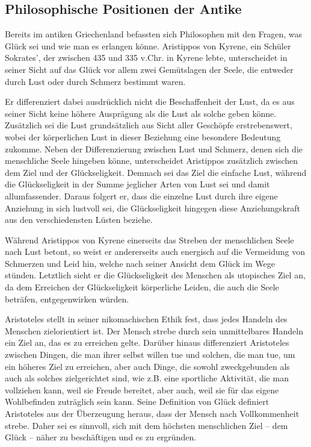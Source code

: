 \subsection{Philosophische Positionen der Antike}

Bereits im antiken Griechenland befassten sich Philosophen mit den Fragen, was Glück sei und wie man es erlangen könne. 
Aristippos von Kyrene, ein Schüler Sokrates', der zwischen 435 und 335 v.Chr. in Kyrene lebte, unterscheidet in seiner Sicht auf das Glück vor allem zwei Gemütslagen der Seele, die entweder durch Lust oder durch Schmerz bestimmt waren\cite[S.\,116]{DL67}.

Er differenziert dabei ausdrücklich nicht die Beschaffenheit der Lust, da es aus seiner Sicht keine höhere Ausprägung als die Lust als solche geben könne. 
Zusätzlich sei die Lust grundsätzlich aus Sicht aller Geschöpfe erstrebenswert, wobei der körperlichen Lust in dieser Beziehung eine besondere Bedeutung zukomme. 
Neben der Differenzierung zwischen Lust und Schmerz, denen sich die menschliche Seele hingeben könne, unterscheidet Aristippos zusätzlich zwischen dem Ziel und der Glückseligkeit. 
Demnach sei das Ziel die einfache Lust, während die Glückseligkeit in der Summe jeglicher Arten von Lust sei und damit allumfassender\cite[S.\,116]{DL67}.
Daraus folgert er, dass die einzelne Lust durch ihre eigene Anziehung in sich lustvoll sei, die Glückseligkeit hingegen diese Anziehungskraft aus den verschiedensten Lüsten beziehe. 

Während Aristippos von Kyrene einerseits das Streben der menschlichen Seele nach Lust betont, so weist er andererseits auch energisch auf die Vermeidung von Schmerzen und Leid hin, welche nach seiner Ansicht dem Glück im Wege stünden. 
Letztlich sieht er die Glückseligkeit des Menschen als utopisches Ziel an, da dem Erreichen der Glückseligkeit körperliche Leiden, die auch die Seele beträfen, entgegenwirken würden\cite[S.\,119]{DL67}.

Aristoteles stellt in seiner nikomachischen Ethik fest, dass jedes Handeln des Menschen zielorientiert ist. 
Der Mensch strebe durch sein unmittelbares Handeln ein Ziel an, das es zu erreichen gelte\cite[S.\,4]{MF93}.
Darüber hinaus differenziert Aristoteles zwischen Dingen, die man ihrer selbst willen tue und solchen, die man tue, um ein höheres Ziel zu erreichen, aber auch Dinge, die sowohl zweckgebunden als auch als solches zielgerichtet sind, wie z.B. eine sportliche Aktivität, die man vollziehen kann, weil sie Freude bereitet, aber auch, weil sie für das eigene Wohlbefinden zuträglich sein kann. 
Seine Definition von Glück definiert Aristoteles aus der Überzeugung heraus, dass der Mensch nach Vollkommenheit strebe. 
Daher sei es sinnvoll, sich mit dem höchsten menschlichen Ziel -- dem Glück -- näher zu beschäftigen und es zu ergründen. 

